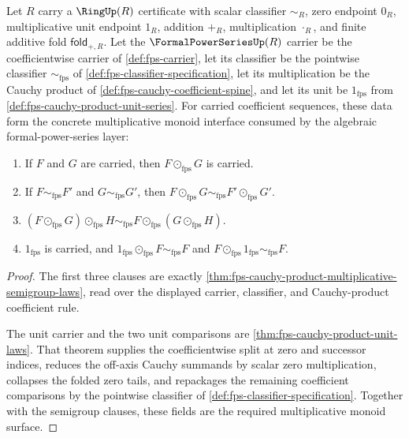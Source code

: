 \begin{theorem}
\label{thm:fps-cauchy-product-multiplicative-monoid-laws}
Let $R$ carry a $\RingUp(R)$ certificate with scalar classifier $\sim_R$, zero endpoint $0_R$, multiplicative unit endpoint $1_R$, addition $+_R$, multiplication $\cdot_R$, and finite additive fold $\mathsf{fold}_{+,R}$. Let the $\FormalPowerSeriesUp(R)$ carrier be the coefficientwise carrier of \autoref{def:fps-carrier}, let its classifier be the pointwise classifier $\sim_{\mathrm{fps}}$ of \autoref{def:fps-classifier-specification}, let its multiplication be the Cauchy product of \autoref{def:fps-cauchy-coefficient-spine}, and let its unit be $1_{\mathrm{fps}}$ from \autoref{def:fps-cauchy-product-unit-series}. For carried coefficient sequences, these data form the concrete multiplicative monoid interface consumed by the algebraic formal-power-series layer:
\begin{enumerate}
  \item If $F$ and $G$ are carried, then $F\odot_{\mathrm{fps}}G$ is carried.
  \item If $F\sim_{\mathrm{fps}}F'$ and $G\sim_{\mathrm{fps}}G'$, then $F\odot_{\mathrm{fps}}G\sim_{\mathrm{fps}}F'\odot_{\mathrm{fps}}G'$.
  \item $(F\odot_{\mathrm{fps}}G)\odot_{\mathrm{fps}}H\sim_{\mathrm{fps}}F\odot_{\mathrm{fps}}(G\odot_{\mathrm{fps}}H)$.
  \item $1_{\mathrm{fps}}$ is carried, and $1_{\mathrm{fps}}\odot_{\mathrm{fps}}F\sim_{\mathrm{fps}}F$ and $F\odot_{\mathrm{fps}}1_{\mathrm{fps}}\sim_{\mathrm{fps}}F$.
\end{enumerate}
\end{theorem}
\begin{proof}
The first three clauses are exactly \autoref{thm:fps-cauchy-product-multiplicative-semigroup-laws}, read over the displayed carrier, classifier, and Cauchy-product coefficient rule.

The unit carrier and the two unit comparisons are \autoref{thm:fps-cauchy-product-unit-laws}. That theorem supplies the coefficientwise split at zero and successor indices, reduces the off-axis Cauchy summands by scalar zero multiplication, collapses the folded zero tails, and repackages the remaining coefficient comparisons by the pointwise classifier of \autoref{def:fps-classifier-specification}. Together with the semigroup clauses, these fields are the required multiplicative monoid surface.
\end{proof}

